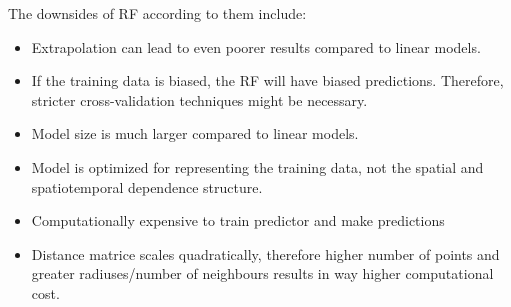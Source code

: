 The downsides of RF according to them include:

\begin{itemize}
    \item Extrapolation can lead to even poorer results compared to linear models.
    \item If the training data is biased, the RF will have biased predictions. Therefore, stricter cross-validation techniques might be necessary.
    \item Model size is much larger compared to linear models.
    \item Model is optimized for representing the training data, not the spatial and spatiotemporal dependence structure.
    \item Computationally expensive to train predictor and make predictions
    \item Distance matrice scales quadratically, therefore higher number of points and greater radiuses/number of neighbours results in way higher computational cost. 
\end{itemize}

